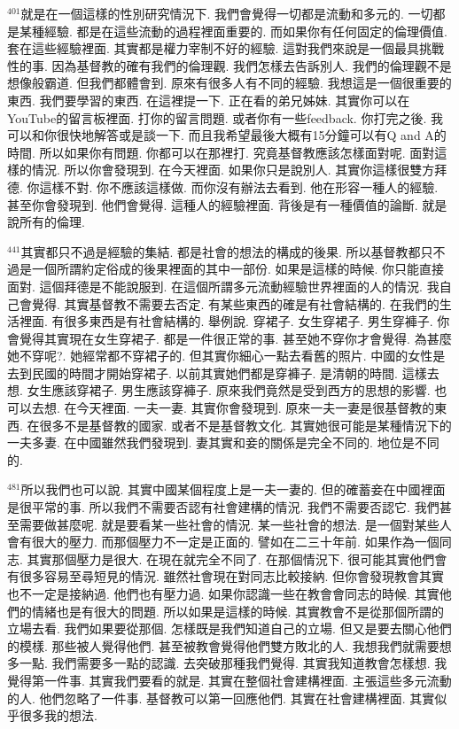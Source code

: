 \documentclass{book}
\begin{document}
$^{401}$就是在一個這樣的性別研究情況下.
我們會覺得一切都是流動和多元的.
一切都是某種經驗.
都是在這些流動的過程裡面重要的.
而如果你有任何固定的倫理價值.
套在這些經驗裡面.
其實都是權力宰制不好的經驗.
這對我們來說是一個最具挑戰性的事.
因為基督教的確有我們的倫理觀.
我們怎樣去告訴別人.
我們的倫理觀不是想像般霸道.
但我們都體會到.
原來有很多人有不同的經驗.
我想這是一個很重要的東西.
我們要學習的東西.
在這裡提一下.
正在看的弟兄姊妹.
其實你可以在YouTube的留言板裡面.
打你的留言問題.
或者你有一些feedback.
你打完之後.
我可以和你很快地解答或是談一下.
而且我希望最後大概有15分鐘可以有Q and A的時間.
所以如果你有問題.
你都可以在那裡打.
究竟基督教應該怎樣面對呢.
面對這樣的情況.
所以你會發現到.
在今天裡面.
如果你只是說別人.
其實你這樣很雙方拜德.
你這樣不對.
你不應該這樣做.
而你沒有辦法去看到.
他在形容一種人的經驗.
甚至你會發現到.
他們會覺得.
這種人的經驗裡面.
背後是有一種價值的論斷.
就是說所有的倫理.

$^{441}$其實都只不過是經驗的集結.
都是社會的想法的構成的後果.
所以基督教都只不過是一個所謂約定俗成的後果裡面的其中一部份.
如果是這樣的時候.
你只能直接面對.
這個拜德是不能說服到.
在這個所謂多元流動經驗世界裡面的人的情況.
我自己會覺得.
其實基督教不需要去否定.
有某些東西的確是有社會結構的.
在我們的生活裡面.
有很多東西是有社會結構的.
舉例說.
穿裙子.
女生穿裙子.
男生穿褲子.
你會覺得其實現在女生穿裙子.
都是一件很正常的事.
甚至她不穿你才會覺得.
為甚麼她不穿呢?.
她經常都不穿裙子的.
但其實你細心一點去看舊的照片.
中國的女性是去到民國的時間才開始穿裙子.
以前其實她們都是穿褲子.
是清朝的時間.
這樣去想.
女生應該穿裙子.
男生應該穿褲子.
原來我們竟然是受到西方的思想的影響.
也可以去想.
在今天裡面.
一夫一妻.
其實你會發現到.
原來一夫一妻是很基督教的東西.
在很多不是基督教的國家.
或者不是基督教文化.
其實她很可能是某種情況下的一夫多妻.
在中國雖然我們發現到.
妻其實和妾的關係是完全不同的.
地位是不同的.

$^{481}$所以我們也可以說.
其實中國某個程度上是一夫一妻的.
但的確蓄妾在中國裡面是很平常的事.
所以我們不需要否認有社會建構的情況.
我們不需要否認它.
我們甚至需要做甚麼呢.
就是要看某一些社會的情況.
某一些社會的想法.
是一個對某些人會有很大的壓力.
而那個壓力不一定是正面的.
譬如在二三十年前.
如果作為一個同志.
其實那個壓力是很大.
在現在就完全不同了.
在那個情況下.
很可能其實他們會有很多容易至尋短見的情況.
雖然社會現在對同志比較接納.
但你會發現教會其實也不一定是接納過.
他們也有壓力過.
如果你認識一些在教會會同志的時候.
其實他們的情緒也是有很大的問題.
所以如果是這樣的時候.
其實教會不是從那個所謂的立場去看.
我們如果要從那個.
怎樣既是我們知道自己的立場.
但又是要去關心他們的模樣.
那些被人覺得他們.
甚至被教會覺得他們雙方敗北的人.
我想我們就需要想多一點.
我們需要多一點的認識.
去突破那種我們覺得.
其實我知道教會怎樣想.
我覺得第一件事.
其實我們要看的就是.
其實在整個社會建構裡面.
主張這些多元流動的人.
他們忽略了一件事.
基督教可以第一回應他們.
其實在社會建構裡面.
其實似乎很多我的想法.
\end{document}
